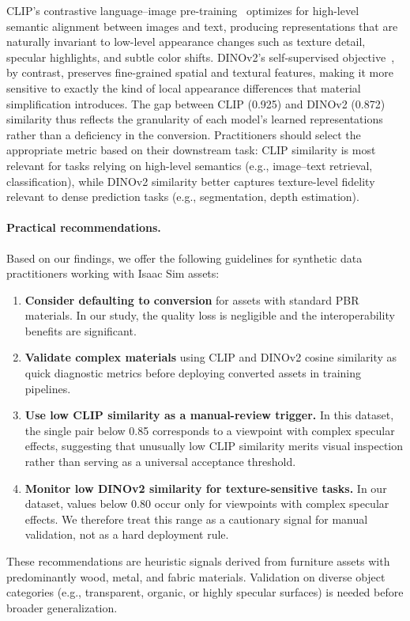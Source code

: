CLIP's contrastive language--image pre-training~\cite{Radford2021Learning}
optimizes for high-level semantic alignment between images and text, producing
representations that are naturally invariant to low-level appearance changes
such as texture detail, specular highlights, and subtle color shifts. DINOv2's
self-supervised objective~\cite{Oquab2023DINOv2}, by contrast, preserves
fine-grained spatial and textural features, making it more sensitive to exactly
the kind of local appearance differences that material simplification
introduces. The gap between CLIP (0.925) and DINOv2 (0.872) similarity thus
reflects the granularity of each model's learned representations rather than a
deficiency in the conversion. Practitioners should select the appropriate
metric based on their downstream task: CLIP similarity is most relevant for
tasks relying on high-level semantics (e.g., image--text retrieval,
classification), while DINOv2 similarity better captures texture-level fidelity
relevant to dense prediction tasks (e.g., segmentation, depth estimation).

\paragraph{Practical recommendations.}
Based on our findings, we offer the following guidelines for synthetic data
practitioners working with Isaac Sim assets:
\begin{enumerate}
    \item \textbf{Consider defaulting to conversion} for assets with standard
    PBR materials. In our study, the quality loss is negligible and the
    interoperability benefits are significant.
    \item \textbf{Validate complex materials} using CLIP and DINOv2 cosine
    similarity as quick diagnostic metrics before deploying converted assets in
    training pipelines.
    \item \textbf{Use low CLIP similarity as a manual-review trigger.} In this
    dataset, the single pair below 0.85 corresponds to a viewpoint with complex
    specular effects, suggesting that unusually low CLIP similarity merits
    visual inspection rather than serving as a universal acceptance threshold.
    \item \textbf{Monitor low DINOv2 similarity for texture-sensitive tasks.}
    In our dataset, values below 0.80 occur only for viewpoints with complex
    specular effects. We therefore treat this range as a cautionary signal for
    manual validation, not as a hard deployment rule.
\end{enumerate}
These recommendations are heuristic signals derived from furniture assets with
predominantly wood, metal, and fabric materials. Validation on diverse object
categories (e.g., transparent, organic, or highly specular surfaces) is needed
before broader generalization.
